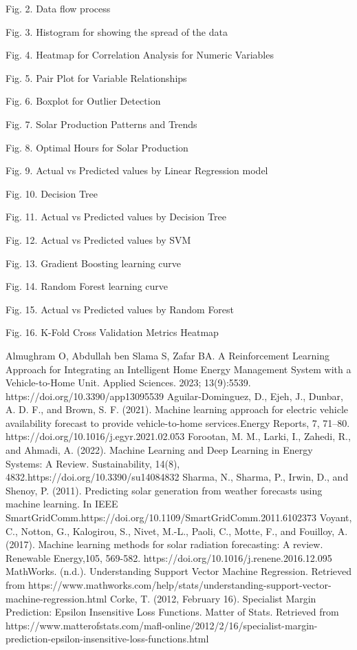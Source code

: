 \documentclass[conference]{IEEEtran}
\begin{document}
\begin{itemize}
Fig. 2. Data flow process

Fig. 3. Histogram for showing the spread of the data

Fig. 4. Heatmap for Correlation Analysis for Numeric Variables

Fig. 5. Pair Plot for Variable Relationships

Fig. 6. Boxplot for Outlier Detection

Fig. 7. Solar Production Patterns and Trends

Fig. 8. Optimal Hours for Solar Production

Fig. 9. Actual vs Predicted values by Linear Regression model

Fig. 10. Decision Tree

Fig. 11. Actual vs Predicted values by Decision Tree

Fig. 12. Actual vs Predicted values by SVM

Fig. 13. Gradient Boosting learning curve

Fig. 14. Random Forest learning curve

Fig. 15. Actual vs Predicted values by Random Forest

Fig. 16. K-Fold Cross Validation Metrics Heatmap
\end{itemize}
\begin{thebibliography}{00}
 Almughram O, Abdullah ben Slama S, Zafar BA. A Reinforcement Learning Approach for Integrating an Intelligent Home Energy Management System with a Vehicle-to-Home Unit. Applied Sciences. 2023; 13(9):5539. https://doi.org/10.3390/app13095539
 Aguilar-Dominguez, D., Ejeh, J., Dunbar, A. D. F., and Brown, S. F. (2021). Machine learning approach for electric vehicle availability forecast to provide vehicle-to-home services.Energy Reports, 7, 71–80. https://doi.org/10.1016/j.egyr.2021.02.053
 Forootan, M. M., Larki, I., Zahedi, R., and Ahmadi, A. (2022). Machine Learning and Deep Learning in Energy Systems: A Review. Sustainability, 14(8), 4832.https://doi.org/10.3390/su14084832
 Sharma, N., Sharma, P., Irwin, D., and Shenoy, P. (2011). Predicting solar generation from weather forecasts using machine learning. In IEEE SmartGridComm.https://doi.org/10.1109/SmartGridComm.2011.6102373
 Voyant, C., Notton, G., Kalogirou, S., Nivet, M.-L., Paoli, C., Motte, F., and Fouilloy, A. (2017). Machine learning methods for solar radiation forecasting: A review. Renewable Energy,105, 569-582. https://doi.org/10.1016/j.renene.2016.12.095
MathWorks. (n.d.). Understanding Support Vector Machine Regression. Retrieved from https://www.mathworks.com/help/stats/understanding-support-vector-machine-regression.html
Corke, T. (2012, February 16). Specialist Margin Prediction: Epsilon Insensitive Loss Functions. Matter of Stats. Retrieved from https://www.matterofstats.com/mafl-online/2012/2/16/specialist-margin-prediction-epsilon-insensitive-loss-functions.html
\end{thebibliography}
\end{document}
